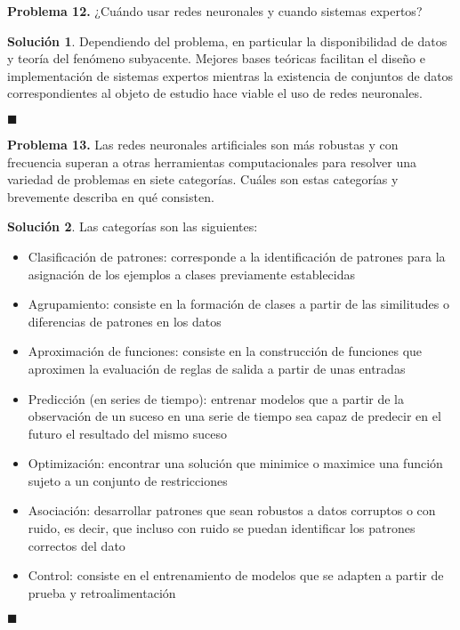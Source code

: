 \documentclass[12pt]{article}
\theoremstyle{plain}
\theoremstyle{definition}
\theoremstyle{definition}
\theoremstyle{definition}
\newtheorem*{solution}{Solución}
\begin{document}
 \noindent \textbf{Problema 12.} ¿Cuándo usar redes neuronales y cuando sistemas expertos?
 \begin{solution}
 Dependiendo del problema, en particular la disponibilidad de datos y teoría del fenómeno subyacente. Mejores bases teóricas facilitan el diseño e implementación de sistemas expertos mientras la existencia de conjuntos de datos correspondientes al objeto de estudio hace viable el uso de redes neuronales.
 \end{solution}
 \begin{flushright}
$\blacksquare$
\end{flushright}
 
 \noindent \textbf{Problema 13.} Las redes neuronales artificiales son más robustas y con frecuencia superan a otras herramientas computacionales para resolver una variedad de problemas en siete categorías. Cuáles son estas categorías y brevemente describa en qué consisten.
 
 \begin{solution}
 Las categorías son las siguientes:\\
 \begin{itemize}
     \item Clasificación de patrones: corresponde a la identificación de patrones para la asignación de los ejemplos a clases previamente establecidas
     \item Agrupamiento: consiste en la formación de clases a partir de las similitudes o diferencias de patrones en los datos 
     \item Aproximación de funciones: consiste en la construcción de funciones que aproximen la evaluación de reglas de salida a partir de unas entradas
     \item Predicción (en series de tiempo): entrenar modelos que a partir de la observación de un suceso en una serie de tiempo sea capaz de predecir en el futuro el resultado del mismo suceso
     \item Optimización: encontrar una solución que minimice o maximice una función sujeto a un conjunto de restricciones
     \item Asociación: desarrollar patrones que sean robustos a datos corruptos o con ruido, es decir, que incluso con ruido se puedan identificar los patrones correctos del dato
     \item Control: consiste en el entrenamiento de modelos que se adapten a partir de prueba y retroalimentación
 \end{itemize}
\end{solution}
\begin{flushright}
$\blacksquare$
\end{flushright}
 
\end{document}

